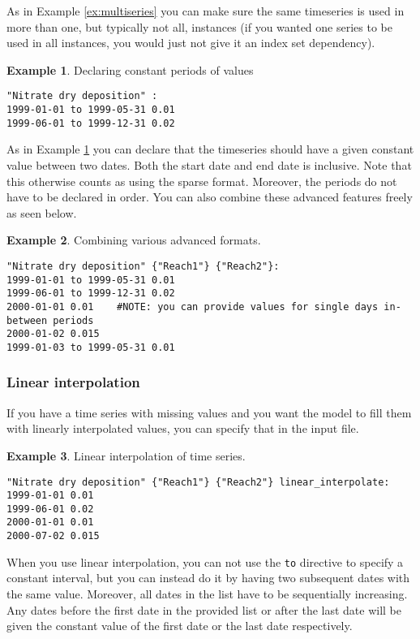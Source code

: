 \documentclass[11pt]{article}
\theoremstyle{definition}
\newtheorem{myexample}{Example}
\newenvironment{example}%
  {\begin{lrbox}{\examplebox}%
   \begin{minipage}{\dimexpr\linewidth-2\fboxsep}
   \begin{myexample}}%
  {\end{myexample}%
   \end{minipage}%
   \end{lrbox}%
   \begin{trivlist}
     \item[]\colorbox{silver}{\usebox\examplebox}
   \end{trivlist}}
\begin{document}
As in Example \ref{ex:multiseries} you can make sure the same timeseries is used in more than one, but typically not all, instances (if you wanted one series to be used in all instances, you would just not give it an index set dependency).

\begin{example}\label{ex:constantperiods}
Declaring constant periods of values
\begin{lstlisting}
"Nitrate dry deposition" :
1999-01-01 to 1999-05-31 0.01
1999-06-01 to 1999-12-31 0.02
\end{lstlisting}
\end{example}

As in Example \ref{ex:constantperiods} you can declare that the timeseries should have a given constant value between two dates. Both the start date and end date is inclusive. Note that this otherwise counts as using the sparse format. Moreover, the periods do not have to be declared in order. You can also combine these advanced features freely as seen below.

\begin{example}
Combining various advanced formats.
\begin{lstlisting}
"Nitrate dry deposition" {"Reach1"} {"Reach2"}:
1999-01-01 to 1999-05-31 0.01
1999-06-01 to 1999-12-31 0.02
2000-01-01 0.01    #NOTE: you can provide values for single days in-between periods
2000-01-02 0.015
1999-01-03 to 1999-05-31 0.01
\end{lstlisting}
\end{example}

\subsubsection{Linear interpolation}

If you have a time series with missing values and you want the model to fill them with linearly interpolated values, you can specify that in the input file.

\begin{example}
Linear interpolation of time series.
\begin{lstlisting}
"Nitrate dry deposition" {"Reach1"} {"Reach2"} linear_interpolate:
1999-01-01 0.01
1999-06-01 0.02
2000-01-01 0.01   
2000-07-02 0.015
\end{lstlisting}
\end{example}

When you use linear interpolation, you can not use the {\tt to} directive to specify a constant interval, but you can instead do it by having two subsequent dates with the same value. Moreover, all dates in the list have to be sequentially increasing. Any dates before the first date in the provided list or after the last date will be given the constant value of the first date or the last date respectively.
\end{document}
